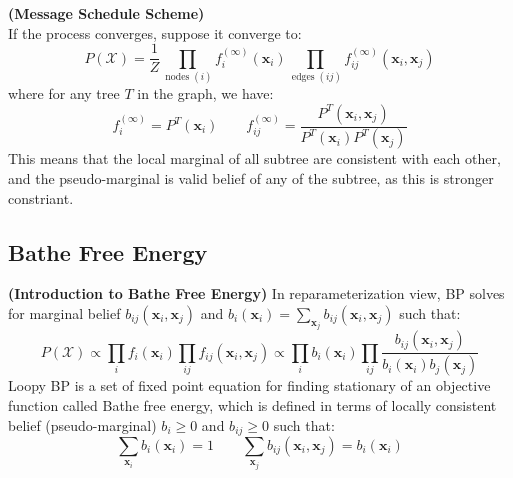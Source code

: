 \begin{remark}{\textbf{(Message Schedule Scheme)}}
\begin{equation*}
    \end{equation*}
    If the process converges, suppose it converge to:
    \begin{equation*}
        P(\mathcal{X}) = \frac{1}{Z}\prod_{\operatorname{nodes}(i)} f_i^{(\infty)}(\boldsymbol x_i)\prod_{\operatorname{edges}(ij)} f_{ij}^{(\infty)}(\boldsymbol x_i, \boldsymbol x_j)
    \end{equation*}
    where for any tree $T$ in the graph, we have:
    \begin{equation*}
        f_i^{(\infty)} = P^T(\boldsymbol x_i)\qquad f_{ij}^{(\infty)} = \frac{P^T(\boldsymbol x_i, \boldsymbol x_j)}{P^T(\boldsymbol x_i)P^T(\boldsymbol x_j)}
    \end{equation*}
    This means that the local marginal of all subtree are consistent with each other, and the pseudo-marginal is valid belief of any of the subtree, as this is stronger constriant. 
\end{remark}

\subsection{Bathe Free Energy}

\begin{remark}{\textbf{(Introduction to Bathe Free Energy)}}
    In reparameterization view, BP solves for marginal belief $b_{ij}(\boldsymbol x_i, \boldsymbol x_j)$ and $b_i(\boldsymbol x_i) = \sum_{\boldsymbol x_j}b_{ij}(\boldsymbol x_i, \boldsymbol x_j)$  such that:
    \begin{equation*}
        P(\mathcal{X}) \propto \prod_if_i(\boldsymbol x_i)\prod_{ij}f_{ij}(\boldsymbol x_i, \boldsymbol x_j) \propto \prod_ib_i(\boldsymbol x_i)\prod_{ij}\frac{b_{ij}(\boldsymbol x_i, \boldsymbol x_j)}{b_i(\boldsymbol x_i)b_j(\boldsymbol x_j)}
    \end{equation*}
    Loopy BP is a set of fixed point equation for finding stationary of an objective function called Bathe free energy, which is defined in terms of locally consistent belief (pseudo-marginal) $b_i\ge0$ and $b_{ij}\ge0$ such that:
    \begin{equation*}
        \sum_{\boldsymbol x_i} b_i(\boldsymbol x_i) = 1 \qquad \sum_{\boldsymbol x_j}b_{ij}(\boldsymbol x_i, \boldsymbol x_j) = b_i(\boldsymbol x_i)
    \end{equation*}
\end{remark}

